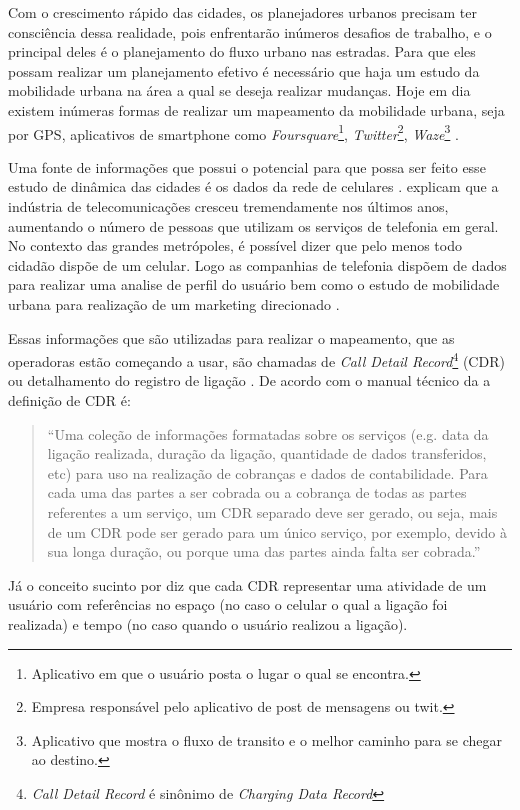         Com o crescimento rápido das cidades, os planejadores urbanos precisam ter consciência
        dessa realidade, pois enfrentarão inúmeros desafios de trabalho, e o principal deles é o
        planejamento do fluxo urbano nas estradas. Para que eles possam realizar um planejamento
        efetivo é necessário que haja um estudo da mobilidade urbana na área a qual se deseja
        realizar mudanças. Hoje em dia existem inúmeras formas de realizar um mapeamento da
        mobilidade urbana, seja por GPS, aplicativos de smartphone como \textit{Foursquare}\footnote{
        Aplicativo em que o usuário posta o lugar o qual se encontra.}, \textit{Twitter}\footnote{
        Empresa responsável pelo aplicativo de post de mensagens ou twit.}, \textit{Waze}\footnote{
        Aplicativo que mostra o fluxo de transito e o melhor caminho para se chegar ao destino.}
        \cite{tugores2013}.

        Uma fonte de informações que possui o potencial para que possa ser feito esse estudo de dinâmica das
        cidades é os dados da rede de celulares \cite{becker2011}.  explicam que a
        indústria de telecomunicações cresceu tremendamente nos últimos anos, aumentando o
        número de pessoas que utilizam os serviços de telefonia em geral. No contexto das grandes
        metrópoles, é possível dizer que pelo menos todo cidadão dispõe de um celular. Logo as
        companhias de telefonia dispõem de dados para realizar uma analise de perfil do usuário
        bem como o estudo de mobilidade urbana para realização de um marketing direcionado
        \cite{khan2009}.

        Essas informações que são utilizadas para realizar o mapeamento, que as operadoras estão
        começando a usar, são chamadas de \textit{Call Detail Record}\footnote{\textit{Call Detail
        Record} é sinônimo de \textit{Charging Data Record}} (CDR) ou detalhamento do registro
        de ligação \cite{furletti2013}. De acordo com o manual técnico da 
        a definição de CDR é: \begin{quote}“Uma coleção de informações formatadas sobre os
        serviços (e.g. data da ligação realizada, duração da ligação, quantidade de dados transferidos,
        etc) para uso na realização de cobranças e dados de contabilidade. Para cada uma das partes
        a ser cobrada ou a cobrança de todas as partes referentes a um serviço, um CDR separado
        deve ser gerado, ou seja, mais de um CDR pode ser gerado para um único serviço, por
        exemplo, devido à sua longa duração, ou porque uma das partes ainda falta ser
        cobrada.”\end{quote} Já o conceito sucinto por  diz que cada CDR
        representar uma atividade de um usuário com referências no espaço (no caso o celular o
        qual a ligação foi realizada) e tempo (no caso quando o usuário realizou a ligação).

